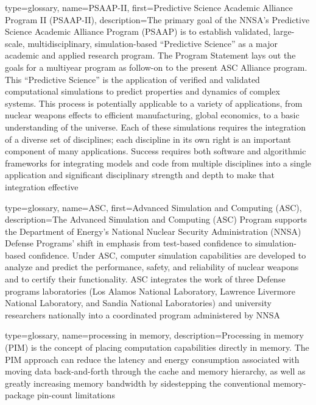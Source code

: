 {
  type={glossary},
  name={PSAAP-II},
  first={Predictive Science Academic Alliance Program II (PSAAP-II)},
  description={The primary goal of the \gls{NNSA}'s Predictive Science Academic
  Alliance Program (PSAAP) is to establish validated, large-scale,
  multidisciplinary, simulation-based ``Predictive Science'' as a
  major academic and applied research program. The Program Statement
  lays out the goals for a multiyear program as follow-on to the
  present ASC Alliance program. This ``Predictive Science'' is the
  application of verified and validated computational simulations to
  predict properties and dynamics of complex systems. This process is
  potentially applicable to a variety of applications, from nuclear
  weapons effects to efficient manufacturing, global economics, to a
  basic understanding of the universe. Each of these simulations
  requires the integration of a diverse set of disciplines; each
  discipline in its own right is an important component of many
  applications. Success requires both software and algorithmic
  frameworks for integrating models and code from multiple disciplines
  into a single application and significant disciplinary strength and
  depth to make that integration effective}
}

{
  type={glossary},
  name={ASC},
  first={Advanced Simulation and Computing (ASC)},
  description={The Advanced Simulation and Computing (ASC) Program
  supports the Department of Energy's National Nuclear Security
  Administration (NNSA) Defense Programs' shift in emphasis from
  test-based confidence to simulation-based confidence. Under ASC,
  computer simulation capabilities are developed to analyze and
  predict the performance, safety, and reliability of nuclear weapons
  and to certify their functionality. ASC integrates the work of three
  Defense programs laboratories (Los Alamos National Laboratory,
  Lawrence Livermore National Laboratory, and Sandia National
  Laboratories) and university researchers nationally into a
  coordinated program administered by NNSA}
}

{
  type={glossary},
  name={processing in memory},
  description={Processing in memory (PIM) is the concept of placing
  computation capabilities directly in memory. The PIM approach can
  reduce the latency and energy consumption associated with moving
  data back-and-forth through the cache and memory hierarchy, as well
  as greatly increasing memory bandwidth by sidestepping the
  conventional memory-package pin-count limitations}
}

